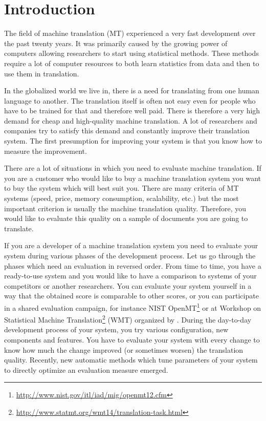 \chapter{Introduction}

The field of machine translation (MT) experienced a very fast development over
the past twenty years. It was primarily caused by the growing power of
computers allowing researchers to start using statistical methods. These methods
require a lot of computer resources to both learn statistics from data and then
to use them in translation.

In the globalized world we live in, there is a need for translating from one
human language to another. The translation itself is often not easy even for
people who have to be trained for that and therefore well paid. There is
therefore a very high demand for cheap and high-quality machine translation. A
lot of researchers and companies try to satisfy this demand and constantly
improve their translation system. The first presumption for improving your
system is that you know how to measure the improvement.

There are a lot of situations in which you need to evaluate machine
translation. If you are a customer who would like to buy a machine translation
system you want to buy the system which will best suit you. There are many
criteria of MT systems (speed, price, memory consumption, scalability, etc.) but
the most important criterion is usually the machine translation quality.
Therefore, you would like to evaluate this quality on a sample of documents you
are going to translate.

If you are a developer of a machine translation system you need to evaluate
your system during various phases of the development process. Let us go through
the phases which need an evaluation in reversed order. From time to time, you
have a ready-to-use system and you would like to have a comparison to systems
of your competitors or another researchers. You can evaluate your system
yourself in a way that the obtained score is comparable to other scores, or you
can participate in a shared evaluation campaign, for instance NIST
OpenMT\footnote{\url{http://www.nist.gov/itl/iad/mig/openmt12.cfm}} or at
Workshop on Statistical Machine
Translation\footnote{\url{http://www.statmt.org/wmt14/translation-task.html}}
(WMT) organized by .  During the day-to-day
development process of your system, you try various configuration, new
components and features. You have to evaluate your system with every change to
know how much the change improved (or sometimes worsen) the translation
quality. Recently, new automatic methods which tune parameters of your system
to directly optimize an evaluation measure emerged.

